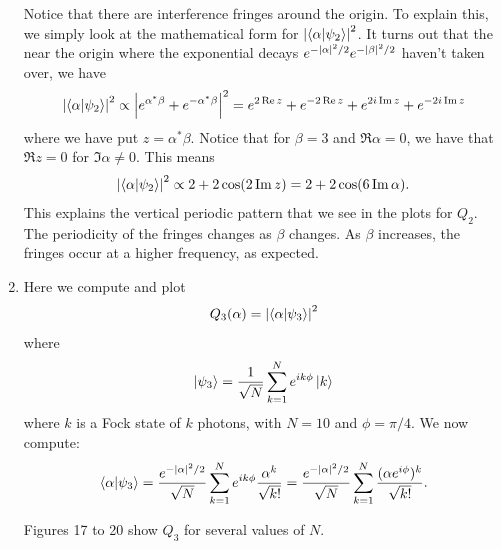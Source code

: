 \documentclass{article}
\theoremstyle{definition}
\newcommand{\al}{\alpha}
\newcommand{\be}{\beta}
\newcommand{\f}[2]{\frac{#1}{#2}}
\begin{document}
\begin{enumerate}[label=\alph*)]
	\noindent Notice that there are interference fringes around the origin. To explain this, we simply look at the mathematical form for $\abs{\braket{\al}{\psi_2}}^2$. It turns out that the near the origin where the exponential decays $e^{-\abs{\al}^2/2} e^{-\abs{\be}^2/2}$ haven't taken over, we have
	\begin{align*}
		\abs{\braket{\al}{\psi_2}}^2 \propto \abs{e^{\al^*\be} + e^{-\al^*\be}}^2 = e^{2\Re z}+ e^{-2\Re z} + e^{2i \Im z} + e^{-2i \Im z}
	\end{align*}
	where we have put $z = \al^*\be$. Notice that for $\be = 3$ and $\Re \al = 0$, we have that $\Re z =0$ for $\Im \al \neq 0$. This means 
	\begin{align*}
			\abs{\braket{\al}{\psi_2}}^2 \propto 2 + 2\cos(2\Im z) = 2 + 2\cos(6 \Im \al).
	\end{align*}
	This explains the vertical periodic pattern that we see in the plots for $Q_2$. The periodicity of the fringes changes as $\be$ changes. As $\be$ increases, the fringes occur at a higher frequency, as expected. 

	
	\item Here we compute and plot 
	\begin{align*}
		Q_3(\al) = \abs{\braket{\al}{\psi_3}}^2
	\end{align*}
	where
	\begin{align*}
		\ket{\psi_3} = \f{1}{\sqrt{N}} \sum^N_{k=1} e^{ik\phi} \ket{k}
	\end{align*}
	where $k$ is a Fock state of $k$ photons, with $N=10$ and $\phi = \pi/4$. We now compute:
	\begin{align*}
		\braket{\al}{\psi_3} = \f{e^{-\abs{\al}^2/2}}{\sqrt{N}}\sum_{k=1}^N e^{ik\phi} \f{\al^k}{\sqrt{k!}} = \f{e^{-\abs{\al}^2/2}}{\sqrt{N}} \sum_{k=1}^{N} \f{(\al e^{i\phi})^k}{\sqrt{k!}}.
	\end{align*}
	
	
	Figures 17 to 20 show $Q_3$ for several values of $N$. 
	

\end{enumerate}
\end{document}
